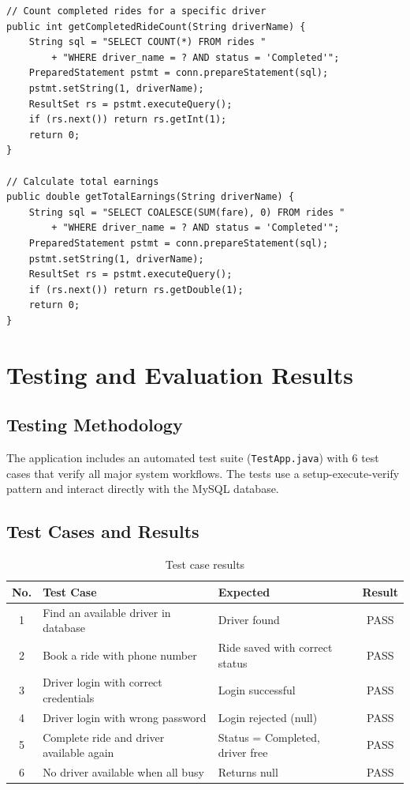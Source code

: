 \documentclass[fonts]{icst}
\begin{document}
\begin{lstlisting}[caption={Querying driver statistics from database}]
// Count completed rides for a specific driver
public int getCompletedRideCount(String driverName) {
    String sql = "SELECT COUNT(*) FROM rides "
        + "WHERE driver_name = ? AND status = 'Completed'";
    PreparedStatement pstmt = conn.prepareStatement(sql);
    pstmt.setString(1, driverName);
    ResultSet rs = pstmt.executeQuery();
    if (rs.next()) return rs.getInt(1);
    return 0;
}

// Calculate total earnings
public double getTotalEarnings(String driverName) {
    String sql = "SELECT COALESCE(SUM(fare), 0) FROM rides "
        + "WHERE driver_name = ? AND status = 'Completed'";
    PreparedStatement pstmt = conn.prepareStatement(sql);
    pstmt.setString(1, driverName);
    ResultSet rs = pstmt.executeQuery();
    if (rs.next()) return rs.getDouble(1);
    return 0;
}
\end{lstlisting}


\section{Testing and Evaluation Results}\label{sec:testing}

\subsection{Testing Methodology}

The application includes an automated test suite (\texttt{TestApp.java}) with 6 test cases that verify all major system workflows. The tests use a setup-execute-verify pattern and interact directly with the MySQL database.

\subsection{Test Cases and Results}

\begin{table}[t]
\centering
\caption{Test case results}
\begin{tabular}{|c|p{6cm}|p{5cm}|c|}
\hline
\textbf{No.} & \textbf{Test Case} & \textbf{Expected} & \textbf{Result} \\ \hline
1 & Find an available driver in database & Driver found & PASS \\ \hline
2 & Book a ride with phone number & Ride saved with correct status & PASS \\ \hline
3 & Driver login with correct credentials & Login successful & PASS \\ \hline
4 & Driver login with wrong password & Login rejected (null) & PASS \\ \hline
5 & Complete ride and driver available again & Status = Completed, driver free & PASS \\ \hline
6 & No driver available when all busy & Returns null & PASS \\ \hline
\end{tabular}
\end{table}
\end{document}
